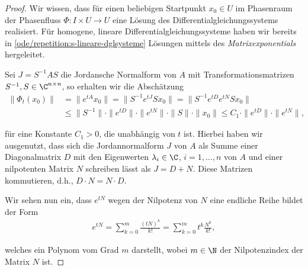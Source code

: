 \documentclass[letterpaper,10pt,english]{jupyterBook}
\begin{document}
\begin{proof}
 Wir wissen, dass für einen beliebigen Startpunkt \(x_0 \in U\) im Phasenraum der Phasenfluss \(\Phi \colon I \times U \rightarrow U\) eine Lösung des Differentialgleichungssystems realisiert.
Für homogene, lineare Differentialgleichungssysteme haben wir bereits in \cref{ode/repetition:s-lineare-dglsysteme}  Lösungen mittels des \emph{Matrixexponentials} hergeleitet.

\par
Sei \(J = S^{-1}AS\) die Jordansche Normalform von \(A\) mit Transformationsmatrizen \(S^{-1},S \in \C^{n \times n}\), so erhalten wir die Abschätzung
\begin{align*}
\|\Phi_t(x_0)\| &= \|e^{tA}x_0\| = \|S^{-1}e^{tJ}Sx_0\| = \|S^{-1}e^{tD}e^{tN}Sx_0\| \\
&\leq \|S^{-1}\| \cdot \|e^{tD}\| \cdot \|e^{tN}\| \cdot \|S\| \cdot \|x_0\| \leq C_1 \cdot \|e^{tD}\| \cdot \|e^{t N}\|,
\end{align*}
\par
für eine Konstante \(C_1 > 0\), die unabhängig von \(t\) ist.
Hierbei haben wir ausgenutzt, dass sich die Jordannormalform \(J\) von \(A\) als Summe einer Diagonalmatrix \(D\) mit den Eigenwerten \(\lambda_i \in \C\), \(i=1,\ldots,n\) von \(A\) und einer nilpotenten Matrix \(N\) schreiben lässt als \(J = D + N\).
Diese Matrizen kommutieren, d.h., \(D \cdot N = N \cdot D\).

\par
Wir sehen nun ein, dass \(e^{tN}\) wegen der Nilpotenz von \(N\) eine endliche Reihe bildet der Form
\begin{align*}
e^{tN} = \sum_{k=0}^m \frac{(tN)^k}{k!} = \sum_{k=0}^m t^k\frac{N^k}{k!},
\end{align*}
\par
welches ein Polynom vom Grad \(m\) darstellt, wobei \(m \in \N\) der Nilpotenzindex der Matrix \(N\) ist.


\end{proof}
\end{document}
